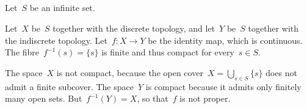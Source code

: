 \subsection{}

Let~$S$ be an infinite set.

Let~$X$ be~$S$ together with the discrete topology, and let~$Y$ be~$S$ together with the indiscrete topology.
Let~$f \colon X \to Y$ be the identity map, which is continuous.
The fibre~$f^{-1}(s) = \{ s \}$ is finite and thus compact for every~$s ∈ S$.

The space~$X$ is not compact, because the open cover~$X = ⋃_{s ∈ S} {} \{ s \}$ does not admit a finite subcover.
The space~$Y$ is compact because it admits only finitely many open sets.
But~$f^{-1}(Y) = X$, so that~$f$ is not proper.

